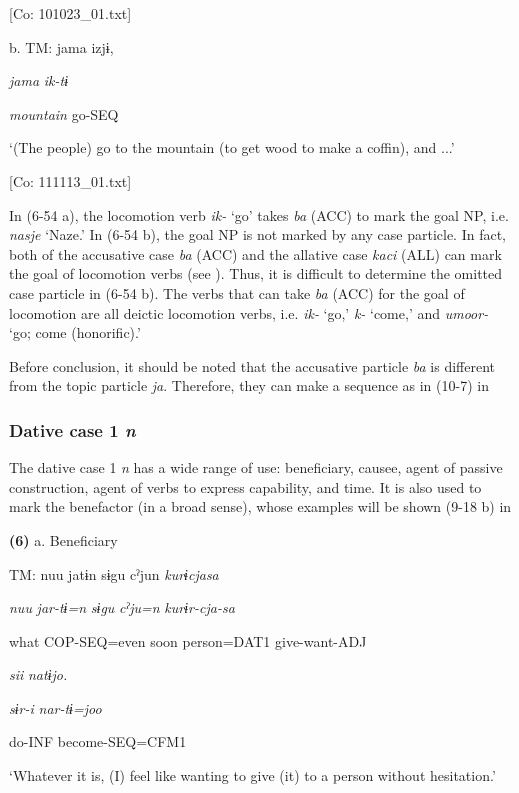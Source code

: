       [Co: 101023\_01.txt]

  b.  TM:  jama  izjɨ,

      \textit{jama}  \textit{ik-tɨ}

      \textit{mountain}  go-SEQ

      ‘(The people) go to the mountain (to get wood to make a coffin), and ...’

      [Co: 111113\_01.txt]

In (6-54 a), the locomotion verb \textit{ik-} ‘go’ takes \textit{ba} (ACC) to mark the goal NP, i.e. \textit{nasje} ‘Naze.’ In (6-54 b), the goal NP is not marked by any case particle. In fact, both of the accusative case \textit{ba} (ACC) and the allative case \textit{kaci} (ALL) can mark the goal of locomotion verbs (see ). Thus, it is difficult to determine the omitted case particle in (6-54 b). The verbs that can take \textit{ba} (ACC) for the goal of locomotion are all deictic locomotion verbs, i.e. \textit{ik-} ‘go,’ \textit{k-} ‘come,’ and \textit{umoor-} ‘go; come (honorific).’

  Before conclusion, it should be noted that the accusative particle \textit{ba} is different from the topic particle \textit{ja}. Therefore, they can make a sequence as in (10-7) in 

\subsubsection{Dative case 1 \textit{n}}

The dative case 1 \textit{n} has a wide range of use: beneficiary, causee, agent of passive construction, agent of verbs to express capability, and time. It is also used to mark the benefactor (in a broad sense), whose examples will be shown (9-18 b) in 

\textbf{(6)}  a.  Beneficiary

    TM:  nuu  jatɨn  sɨgu  cˀjun  \textit{kurɨcjasa}

      \textit{nuu}  \textit{jar-tɨ=n}  \textit{sɨgu}  \textit{cˀju=n}  \textit{kurɨr-cja-sa}

      what  COP-SEQ=even  soon  person=DAT1  give-want-ADJ

      \textit{sii}  \textit{natɨjo.}

      \textit{sɨr-i}  \textit{nar-tɨ=joo}

      do-INF  become-SEQ=CFM1

      ‘Whatever it is, (I) feel like wanting to give (it) to a person without hesitation.’

